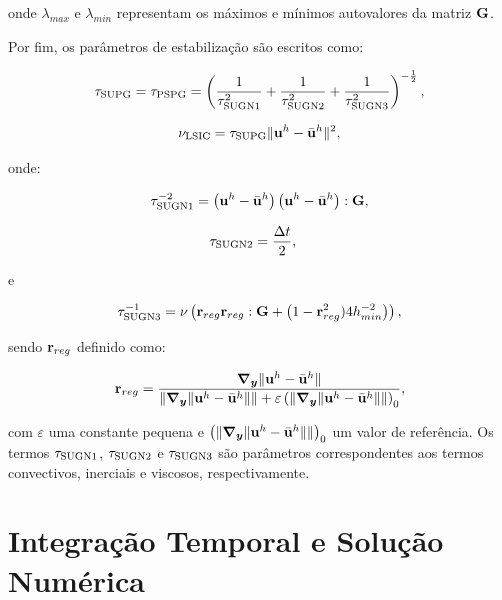 \documentclass[tese_patricia]{subfiles}%
\begin{document}
\noindent onde $\lambda_{max}$ e $\lambda_{min}$ representam os máximos e mínimos autovalores da matriz $\mathbf{G}$. 

Por fim, os parâmetros de estabilização são escritos como:

\begin{align}
	\tau_{\mathrm{SUPG}} = \tau_{\mathrm{PSPG}} =\left(\frac{1}{\tau_{\mathrm{SUGN1}}^2} + \frac{1}{\tau_{\mathrm{SUGN2}}^2} + \frac{1}{\tau_{\mathrm{SUGN3}}^2} \right)^{-\frac{1}{2}},
\end{align}

\begin{align}
	\nu_{\mathrm{LSIC}} = \tau_{\mathrm{SUPG}} \lVert\mathbf{u}^h - \bar{\mathbf{u}}^h\rVert^2,
\end{align}

\noindent onde:

\begin{align}
	\tau_{\mathrm{SUGN1}}^{-2} = \left(\mathbf{u}^h - \bar{\mathbf{u}}^h \right) \left(\mathbf{u}^h - \bar{\mathbf{u}}^h \right) : \mathbf{G} ,
\end{align}

\begin{align}
	\tau_{\mathrm{SUGN2}}&=\frac{\Delta t}{2},
\end{align}

\noindent e

\begin{align}
	\tau_{\mathrm{SUGN3}}^{-1} = \nu \left(\mathbf{r}_{reg}\mathbf{r}_{reg} : \mathbf{G} + \left(1 - \mathbf{r}_{reg}^2)4h_{min}^{-2} \right)\right) ,
\end{align}

\noindent sendo $\mathbf{r}_{reg}$ definido como:

\begin{align}
	\mathbf{r}_{reg} =\frac{\boldsymbol{\nabla_y} \lVert\mathbf{u}^h - \bar{\mathbf{u}}^h\rVert}{\lVert \boldsymbol{\nabla_y} \lVert\mathbf{u}^h - \bar{\mathbf{u}}^h\rVert\rVert + \varepsilon\left(\lVert \boldsymbol{\nabla_y} \lVert\mathbf{u}^h - \bar{\mathbf{u}}^h\rVert\rVert\right)_0},
\end{align}

\noindent com $\varepsilon$ uma constante pequena e $\left(\lVert \boldsymbol{\nabla_y} \lVert\mathbf{u}^h- \bar{\mathbf{u}}^h\rVert\rVert\right)_0$ um valor de referência. Os termos $\tau_{\mathrm{SUGN1}}$, $\tau_{\mathrm{SUGN2}}$ e $\tau_{\mathrm{SUGN3}}$ são parâmetros correspondentes aos termos convectivos, inerciais e viscosos, respectivamente.

\section{Integração Temporal e Solução Numérica}\label{capitulo:Cap2:IntegTemp}
\end{document}
